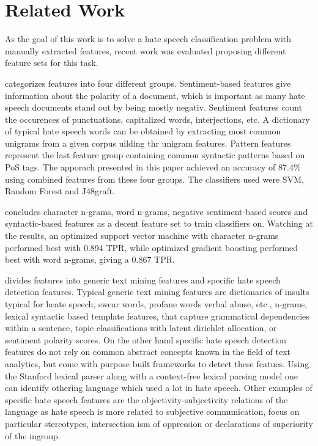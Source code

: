\newpage
\section{Related Work} \label{related_work}

As the goal of this work is to solve a hate speech classification problem with manually extracted features, recent work was evaluated proposing different feature sets for this task. 

\cite{Watanabe2018} categorizes features into four different groups. Sentiment-based fea\-tures give information about the polarity of a document, which is important as many hate speech documents stand out by being mostly negativ. Sentiment features count the occurences of punctuations, capitalized words, interjections, etc. A dictionary of typical hate speech words can be obtained by extracting most common unigrams from a given corpus uilding thr unigram features. Pattern features represent the last feature group containing common syntactic patterns based on PoS tags. The apporach presented in this paper achieved an accuracy of 87.4\% using combined features from these four groups. The classifiers used were SVM, Random Forest and J48graft.

\cite{Oriola2020} concludes character n-grams, word n-grams, negative sentiment-based scores and syntactic-based features as a decent feature set to train classifiers on. Watching at the results, an optimized support vector machine with character n-grams performed best with 0.894 TPR, while optimized gradient boosting performed best with word n-grams, giving a 0.867 TPR. 

\cite{Fortuna2018} divides features into generic text mining features and specific hate speech detection features. Typical generic text mining features are dictionaries of insults typical for heate speech, swear words, profane words verbal abuse, etc., n-grams, lexical syntactic based template features, that capture gram\-mat\-i\-cal dependencies within a sentence, topic classifications with latent dirich\-let allocation, or sentiment polarity scores. On the other hand specific hate speech detection features do not rely on common abstract concepts known in the field of text analytics, but come with purpose built frameworks to detect these featues. Using the Stanford lexical parser along with a context-free lexical parsing model one can identify othering language which used a lot in hate speech. Other examples of specific hate speech features are the objectivity-subjectivity relations of the language as hate speech is more related to subjective communication, focus on particular stereotypes, in\-ter\-sec\-tion \-ism of oppression or declarations of superiority of the ingroup. 

